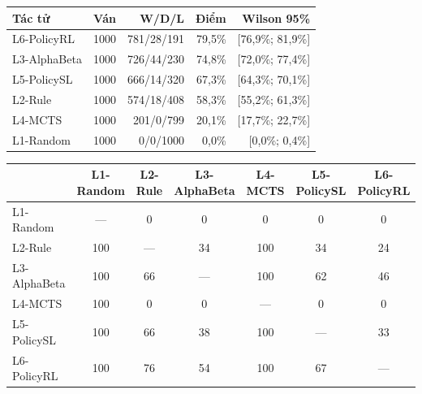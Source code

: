 \begin{center}\small
\begin{tabular}{@{}lrrrr@{}}
\toprule
Tác tử & Ván & W/D/L & Điểm & Wilson 95\% \\
\midrule
L6-PolicyRL & 1000 & 781/28/191 & 79,5\% & [76,9\%; 81,9\%] \\
L3-AlphaBeta & 1000 & 726/44/230 & 74,8\% & [72,0\%; 77,4\%] \\
L5-PolicySL & 1000 & 666/14/320 & 67,3\% & [64,3\%; 70,1\%] \\
L2-Rule & 1000 & 574/18/408 & 58,3\% & [55,2\%; 61,3\%] \\
L4-MCTS & 1000 & 201/0/799 & 20,1\% & [17,7\%; 22,7\%] \\
L1-Random & 1000 & 0/0/1000 & 0,0\% & [0,0\%; 0,4\%] \\
\bottomrule
\end{tabular}
\end{center}
\begin{center}\scriptsize\setlength{\tabcolsep}{3pt}
\begin{tabular}{@{}lcccccc@{}}
\toprule
 & L1-Random & L2-Rule & L3-AlphaBeta & L4-MCTS & L5-PolicySL & L6-PolicyRL \\
\midrule
L1-Random & — & 0 & 0 & 0 & 0 & 0 \\
L2-Rule & 100 & — & 34 & 100 & 34 & 24 \\
L3-AlphaBeta & 100 & 66 & — & 100 & 62 & 46 \\
L4-MCTS & 100 & 0 & 0 & — & 0 & 0 \\
L5-PolicySL & 100 & 66 & 38 & 100 & — & 33 \\
L6-PolicyRL & 100 & 76 & 54 & 100 & 67 & — \\
\bottomrule
\end{tabular}
\end{center}